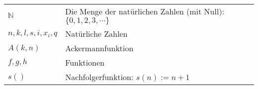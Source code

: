 \documentclass[a4paper]{amsart}
\theoremstyle{definition}
\newcommand{\N}{\ensuremath{\mathbb{ N }}}
\begin{document}
\renewcommand*{\arraystretch}{1}

\begin{tabular}{ll}
    $\N$                    & Die Menge der natürlichen Zahlen (mit Null): $\{ 0, 1, 2, 3, \cdots \}$\\
    $n, k, l, s, i, x_i, q$ & Natürliche Zahlen\\
    $A( k, n )$             & Ackermannfunktion\\
    $f, g, h$               & Funktionen\\
    $s()$                   & Nachfolgerfunktion: $s(n) := n+1$

\end{tabular}
\end{document}

